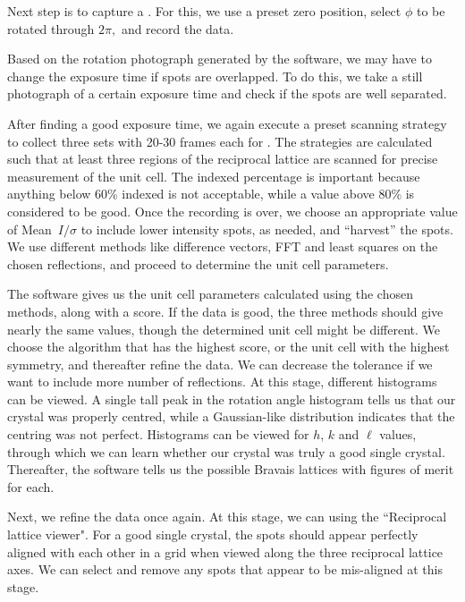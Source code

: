 Next step is to capture a . For this, we use a preset zero position, select $\phi$ to be rotated through $2\pi,$ and record the data.

Based on the rotation photograph generated by the software, we may have to change the exposure time if spots are overlapped. To do this, we take a still photograph of a certain exposure time and check if the spots are well separated.

After finding a good exposure time, we again execute a preset scanning strategy to collect three sets with 20-30 frames each for . The strategies are calculated such that at least three regions of the reciprocal lattice are scanned for precise measurement of the unit cell. The indexed percentage is important because anything below 60\% indexed is not acceptable, while a value above 80\% is considered to be good. Once the recording is over, we choose an appropriate value of Mean~$I/\sigma$ to include lower intensity spots, as needed, and ``harvest'' the spots. We use different methods like difference vectors, FFT and least squares on the chosen reflections, and proceed to determine the unit cell parameters.

The software gives us the unit cell parameters calculated using the chosen methods, along with a score. If the data is good, the three methods should give nearly the same values, though the determined unit cell might be different. We choose the algorithm that has the highest score, or the unit cell with the highest symmetry, and thereafter refine the data. We can decrease the tolerance if we want to include more number of reflections. At this stage, different histograms can be viewed. A single tall peak in the rotation angle histogram tells us that our crystal was properly centred, while a Gaussian-like distribution indicates that the centring was not perfect. Histograms can be viewed for $h$, $k$ and $\ell$ values, through which we can learn whether our crystal was truly a good single crystal. Thereafter, the software tells us the possible Bravais lattices with figures of merit for each.

Next, we refine the data once again. At this stage, we can  using the ``Reciprocal lattice viewer". For a good single crystal, the spots should appear perfectly aligned with each other in a grid when viewed along the three reciprocal lattice axes. We can select and remove any spots that appear to be mis-aligned at this stage.

